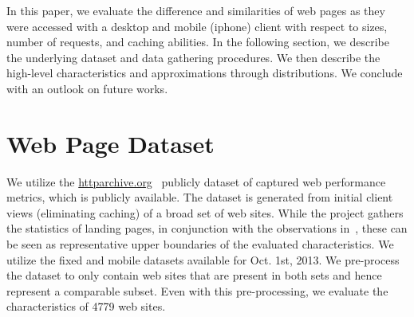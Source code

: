 \documentclass[letterpaper,conference]{IEEEtran}
\begin{document}
In this paper, we evaluate the difference and similarities of web pages as they were accessed with a desktop and mobile (iphone) client with respect to sizes, number of requests, and caching abilities.
In the following section, we describe the underlying dataset and data gathering procedures. We then describe the high-level characteristics and approximations through distributions.
We conclude with an outlook on future works.

\section{Web Page Dataset}
We utilize the \url{httparchive.org}~\cite{ht13} publicly dataset of captured web performance metrics, which is publicly available. 
The dataset is generated from initial client views (eliminating caching) of a broad set of web sites. 
While the project gathers the statistics of landing pages, in conjunction with the observations in~\cite{BuMaSe13}, these can be seen as representative upper boundaries of the evaluated characteristics.
We utilize the fixed and mobile datasets available for Oct. 1st, 2013. 
We pre-process the dataset to only contain web sites that are present in both sets and hence represent a comparable subset. 
Even with this pre-processing, we evaluate the characteristics of 4779 web sites.
\end{document}
